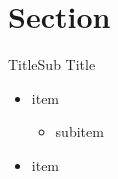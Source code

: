 \section{Section}
\begin{frame}[fragile]{Title}{Sub Title}
  
  \begin{itemize}
    \item item
    \begin{itemize}
      \item subitem
    \end{itemize}
    \item item
  \end{itemize}
\end{frame}
